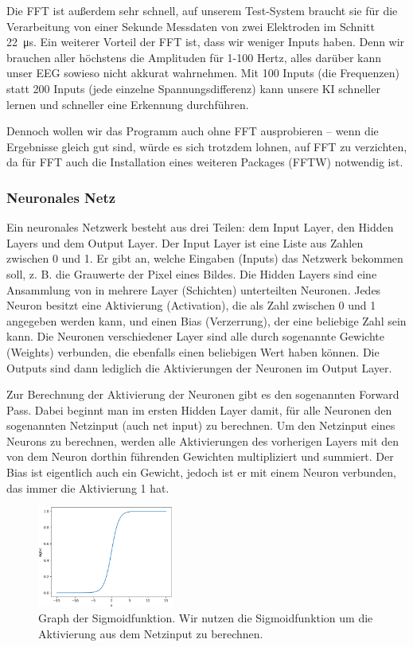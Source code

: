 \documentclass[10pt]{scrartcl}
\begin{document}
	Die FFT ist außerdem sehr schnell, auf unserem Test-System braucht sie für die Verarbeitung von einer Sekunde Messdaten von zwei Elektroden im Schnitt \qty{22}{\micro\second}. Ein weiterer Vorteil der FFT ist, dass wir weniger Inputs haben. Denn wir brauchen aller höchstens die Amplituden für 1-100 Hertz, alles darüber kann unser EEG sowieso nicht akkurat wahrnehmen. Mit 100 Inputs (die Frequenzen) statt 200 Inputs (jede einzelne Spannungsdifferenz) kann unsere KI schneller lernen und schneller eine Erkennung durchführen.

	Dennoch wollen wir das Programm auch ohne FFT ausprobieren -- wenn die Ergebnisse gleich gut sind, würde es sich trotzdem lohnen, auf FFT zu verzichten, da für FFT auch die Installation eines weiteren Packages (FFTW) notwendig ist. 

	\subsubsection{Neuronales Netz}

	Ein neuronales Netzwerk besteht aus drei Teilen: dem Input Layer, den Hidden Layers und dem Output Layer. 
	Der Input Layer ist eine Liste aus Zahlen zwischen 0 und 1. Er gibt an, welche Eingaben (Inputs) das Netzwerk bekommen soll, z. B. die Grauwerte der Pixel eines Bildes.
	Die Hidden Layers sind eine Ansammlung von in mehrere Layer (Schichten) unterteilten Neuronen.
	Jedes Neuron besitzt eine Aktivierung (Activation), die als Zahl zwischen 0 und 1 angegeben werden kann, und einen Bias (Verzerrung), der eine beliebige Zahl sein kann. Die Neuronen verschiedener Layer sind alle durch sogenannte Gewichte (Weights) verbunden, die ebenfalls einen beliebigen Wert haben können.
	Die Outputs sind dann lediglich die Aktivierungen der Neuronen im Output Layer.


	Zur Berechnung der Aktivierung der Neuronen gibt es den sogenannten Forward Pass. Dabei beginnt man im ersten Hidden Layer damit, für alle Neuronen den sogenannten Netzinput (auch net input) zu berechnen. Um den Netzinput eines Neurons zu berechnen, werden alle Aktivierungen des vorherigen Layers mit den von dem Neuron dorthin führenden Gewichten multipliziert und summiert. Der Bias ist eigentlich auch ein Gewicht, jedoch ist er mit einem Neuron verbunden, das immer die Aktivierung 1 hat.

	\begin{figure}
		\centering
		\vspace*{-5mm}
		\includegraphics[width=0.4\textwidth]{pictures/sig_func.png}
		\caption{Graph der Sigmoidfunktion. Wir nutzen die Sigmoidfunktion um die Aktivierung aus dem Netzinput zu berechnen.}
		\label{sig_func}
	\end{figure}
\end{document}
